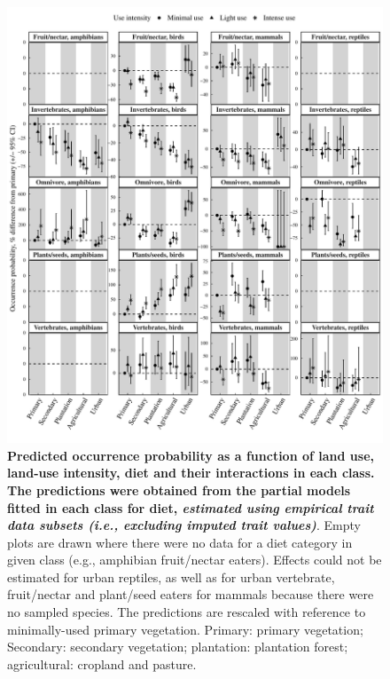 \begin{figure}[h!]
\centering
\includegraphics[scale=0.65]{Supporting/Chapter4/Figures/Partial_models_predictions/Validations/Diet}
\caption[Predicted occurrence probability as a function of land use, land-use intensity, diet and their interactions in each class: from validation models using empirical, non imputed trait values]{\textbf{Predicted occurrence probability as a function of land use, land-use intensity, diet and their interactions in each class. The predictions were obtained from the partial models fitted in each class for diet, \textit{estimated using empirical trait data subsets (i.e., excluding imputed trait values)}}. Empty plots are drawn where there were no data for a diet category in  given class (e.g., amphibian fruit/nectar eaters). Effects could not be estimated for urban reptiles, as well as for urban vertebrate, fruit/nectar and plant/seed eaters for mammals because there were no sampled species. The predictions are rescaled with reference to minimally-used primary vegetation. Primary: primary vegetation; Secondary: secondary vegetation; plantation: plantation forest; agricultural: cropland and pasture.}
\label{SI_4_Figure_23}
\end{figure}


